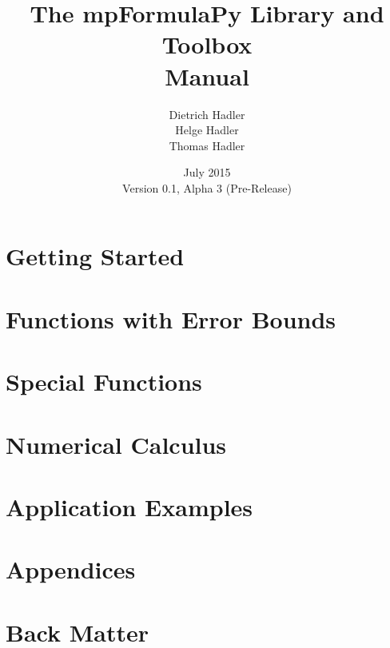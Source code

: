 \documentclass[12pt,a4paper,openany]{book}
\numberwithin{equation}{section}
\begin{document}
\begin{titlepage}
\author{
Dietrich Hadler\\
Helge Hadler\\
Thomas Hadler
} 
\title{The mpFormulaPy Library and Toolbox\\[0.2cm]
 Manual} 
\date{July 2015 \\ 
Version {0.1}, Alpha 3 (Pre-Release)}
\maketitle
\end{titlepage}

\thispagestyle{empty}

\setcounter{page}{1}
\frontmatter
\maketitle

\setlength{\parindent}{0pt}



\tableofcontents
\listoftables
\listoffigures

\mainmatter
\setlength{\parindent}{0pt}

\part{Getting Started}



\part{Functions with Error Bounds}



\part{Special Functions}



\part{Numerical Calculus}



\part{Application Examples}

%


\part{Appendices}
\begin{appendices}

\end{appendices}


\part{Back Matter}
\backmatter
 
 
\printnomenclature[1.2in]
\printindex
\end{document}
